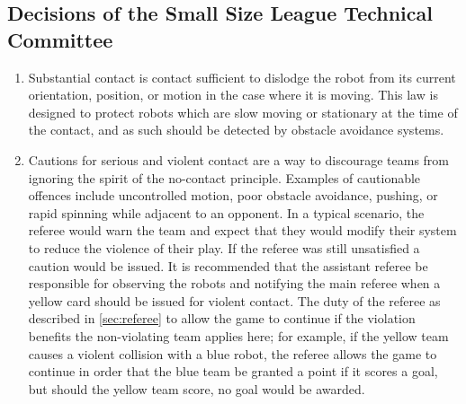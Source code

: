 \subsection*{Decisions of the Small Size League Technical Committee}
\begin{enumerate}
\item
Substantial contact is contact sufficient to dislodge the robot from its current orientation, position, or motion in the case where it is moving. 
This law is designed to protect robots which are slow moving or stationary at the time of the contact, and as such should be detected by obstacle avoidance systems.

\item
Cautions for serious and violent contact are a way to discourage teams from ignoring the spirit of the no-contact principle.
Examples of cautionable offences include uncontrolled motion, poor obstacle avoidance, pushing, or rapid spinning while adjacent to an opponent.
In a typical scenario, the referee would warn the team and expect that they would modify their system to reduce the violence of their play.
If the referee was still unsatisfied a caution would be issued.
It is recommended that the assistant referee be responsible for observing the robots and notifying the main referee when a yellow card should be issued for violent contact.
The duty of the referee as described in \autoref{sec:referee} to allow the game to continue if the violation benefits the non-violating team applies here; for example, if the yellow team causes a violent collision with a blue robot, the referee allows the game to continue in order that the blue team be granted a point if it scores a goal, but should the yellow team score, no goal would be awarded.



\end{enumerate}
